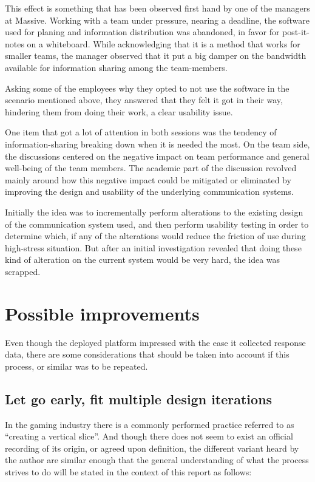   This effect is something that has been observed first hand by one of the
  managers at Massive. Working with a team under pressure, nearing a deadline,
  the software used for planing and information distribution was abandoned, in
  favor for post-it-notes on a whiteboard. While acknowledging that it is a
  method that works for smaller teams, the manager observed that it put a big
  damper on the bandwidth available for information sharing among the
  team-members.

  Asking some of the employees why they opted to not use the software in the scenario
  mentioned above, they answered that they felt it got in their way, hindering
  them from doing their work, a clear usability issue.

  One item that got a lot of attention in both sessions was the tendency of
  information-sharing breaking down when it is needed the most. On the team
  side, the discussions centered on the negative impact on team performance and
  general well-being of the team members. The academic part of the discussion
  revolved mainly around how this negative impact could be mitigated or
  eliminated by improving the design and usability of the underlying
  communication systems.

  Initially the idea was to incrementally perform alterations to the existing
  design of the communication system used, and then perform usability testing in
  order to determine which, if any of the alterations would reduce the friction
  of use during high-stress situation. But after an initial investigation
  revealed that doing these kind of alteration on the current system would be
  very hard, the idea was scrapped.


\section{Possible improvements}

  Even though the deployed platform impressed with the ease it collected
  response data, there are some considerations that should be taken into
  account if this process, or similar was to be repeated.

  \subsection{Let go early, fit multiple design iterations}

  In the gaming industry there is a commonly performed practice referred to as
  ``creating a vertical slice''. And though there does not seem to exist an
  official recording of its origin, or agreed upon definition, the different
  variant heard by the author are similar enough that the general understanding
  of what the process strives to do will be stated in the context of this
  report as follows:

